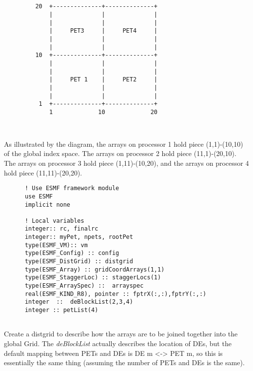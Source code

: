    \begin{verbatim}
  
    
         20  +--------------+--------------+
             |              |              |                       
             |              |              |                       
             |     PET3     |     PET4     |                       
             |              |              |                       
             |              |              |  
         10  +--------------+--------------+ 
             |              |              |                       
             |              |              |                       
             |     PET 1    |     PET2     |                       
             |              |              |  
             |              |              |                      
          1  +--------------+--------------+
             1             10             20  
  
  
   \end{verbatim}
  
     As illustrated by the diagram, the arrays on processor 1 hold piece (1,1)-(10,10) of the 
     global index space. The arrays on processor 2 hold piece (11,1)-(20,10). The arrays on 
     processor 3 hold piece (1,11)-(10,20), and the arrays on processor 4 hold piece (11,11)-(20,20).
   

 \begin{verbatim}
      ! Use ESMF framework module
      use ESMF
      implicit none

      ! Local variables  
      integer:: rc, finalrc
      integer:: myPet, npets, rootPet
      type(ESMF_VM):: vm
      type(ESMF_Config) :: config
      type(ESMF_DistGrid) :: distgrid
      type(ESMF_Array) :: gridCoordArrays(1,1)
      type(ESMF_StaggerLoc) :: staggerLocs(1)
      type(ESMF_ArraySpec) ::  arrayspec
      real(ESMF_KIND_R8), pointer :: fptrX(:,:),fptrY(:,:)
      integer  ::  deBlockList(2,3,4)
      integer :: petList(4)
 
\end{verbatim}
 

   Create a distgrid to describe how the arrays are to be joined together into the
   global Grid. The {\it deBlockList} actually describes the location of
   DEs, but the default mapping between PETs and DEs is DE m <-> PET m, so
   this is essentially the same thing (assuming the number of PETs and DEs is the 
   same). 

